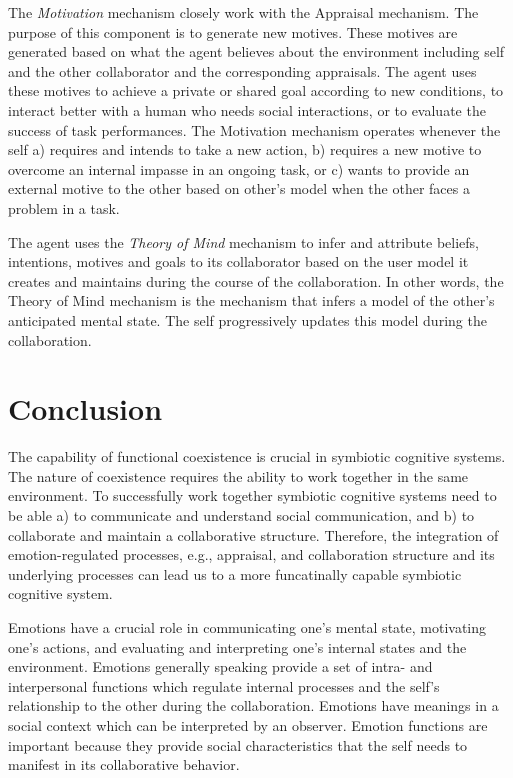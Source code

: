 \documentclass[letterpaper]{article}
\begin{document}
The \textit{Motivation} mechanism closely work with the Appraisal mechanism. The
purpose of this component is to generate new motives. These motives are
generated based on what the agent believes about the environment including self
and the other collaborator and the corresponding appraisals. The agent uses
these motives to achieve a private or shared goal according to new conditions,
to interact better with a human who needs social interactions, or to evaluate
the success of task performances. The Motivation mechanism operates whenever the
self a) requires and intends to take a new action, b) requires a new motive to
overcome an internal impasse in an ongoing task, or c) wants to provide an
external motive to the other based on other's model when the other faces a
problem in a task.

The agent uses the \textit{Theory of Mind} mechanism to infer and attribute
beliefs, intentions, motives and goals to its collaborator based on the user
model it creates and maintains during the course of the collaboration. In
other words, the Theory of Mind mechanism is the mechanism that infers a model
of the other's anticipated mental state. The self progressively updates this
model during the collaboration.

\section{Conclusion}

The capability of functional coexistence is crucial in symbiotic cognitive
systems. The nature of coexistence requires the ability to work together in the
same environment. To successfully work together symbiotic cognitive systems need
to be able a) to communicate and understand social communication, and b) to
collaborate and maintain a collaborative structure. Therefore, the integration
of emotion-regulated processes, e.g., appraisal, and collaboration structure and
its underlying processes can lead us to a more funcatinally capable symbiotic
cognitive system.

Emotions have a crucial role in communicating one's mental state, motivating
one's actions, and evaluating and interpreting one's internal states and the
environment. Emotions generally speaking provide a set of intra- and
interpersonal functions which regulate internal processes and the self's
relationship to the other during the collaboration.
Emotions have meanings in a social context which can be interpreted by an
observer. Emotion functions are important because they provide social
characteristics that the self needs to manifest in its collaborative behavior. 
\end{document}
